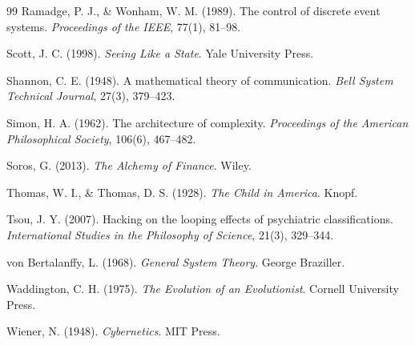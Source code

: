 \documentclass[11pt,oneside,openany]{book}
\begin{document}
\begin{thebibliography}{99}
Ramadge, P. J., & Wonham, W. M. (1989).
The control of discrete event systems.
\textit{Proceedings of the IEEE}, 77(1), 81--98.

Scott, J. C. (1998).
\textit{Seeing Like a State}.
Yale University Press.

Shannon, C. E. (1948).
A mathematical theory of communication.
\textit{Bell System Technical Journal}, 27(3), 379--423.

Simon, H. A. (1962).
The architecture of complexity.
\textit{Proceedings of the American Philosophical Society}, 106(6), 467--482.

Soros, G. (2013).
\textit{The Alchemy of Finance}.
Wiley.

Thomas, W. I., & Thomas, D. S. (1928).
\textit{The Child in America}.
Knopf.

Tsou, J. Y. (2007).
Hacking on the looping effects of psychiatric classifications.
\textit{International Studies in the Philosophy of Science}, 21(3), 329--344.

von Bertalanffy, L. (1968).
\textit{General System Theory}.
George Braziller.

Waddington, C. H. (1975).
\textit{The Evolution of an Evolutionist}.
Cornell University Press.

Wiener, N. (1948).
\textit{Cybernetics}.
MIT Press.

\end{thebibliography}
\end{document}
